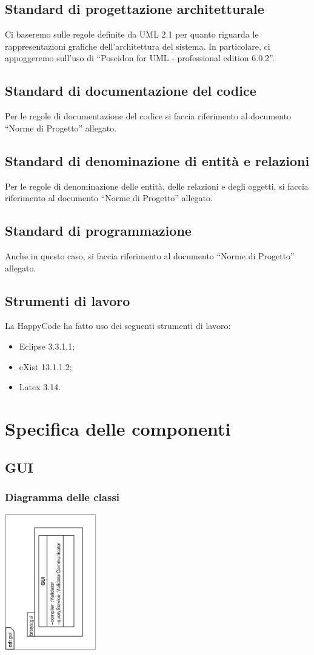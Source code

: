 \documentclass[11pt,titlepage,a4paper]{report}
\begin{document}
\section{Standard di progettazione architetturale}
Ci baseremo sulle regole definite da UML 2.1 per quanto riguarda le rappresentazioni grafiche dell'architettura del sistema. In particolare, ci appoggeremo sull'uso di ``Poseidon for UML - professional edition 6.0.2''.
\section{Standard di documentazione del codice}
Per le regole di documentazione del codice si faccia riferimento al documento ``Norme di Progetto'' allegato.
\section{Standard di denominazione di entit\`a e relazioni}
Per le regole di denominazione delle entit\`a, delle relazioni e degli oggetti, si faccia riferimento al documento ``Norme di Progetto'' allegato.
\section{Standard di programmazione}
Anche in questo caso, si faccia riferimento al documento ``Norme di Progetto'' allegato.
\section{Strumenti di lavoro}
La HappyCode ha fatto uso dei seguenti strumenti di lavoro:
\begin{itemize}
\item Eclipse 3.3.1.1;
\item eXist 13.1.1.2; 
\item Latex 3.14.
\end{itemize}
\chapter{Specifica delle componenti}
\section{GUI}
\subsection{Diagramma delle classi}
\begin{center}
\includegraphics[width=0.3\textwidth, angle=-90]{DiagrammaClassi/gui.eps}
\end{center}
\end{document}
